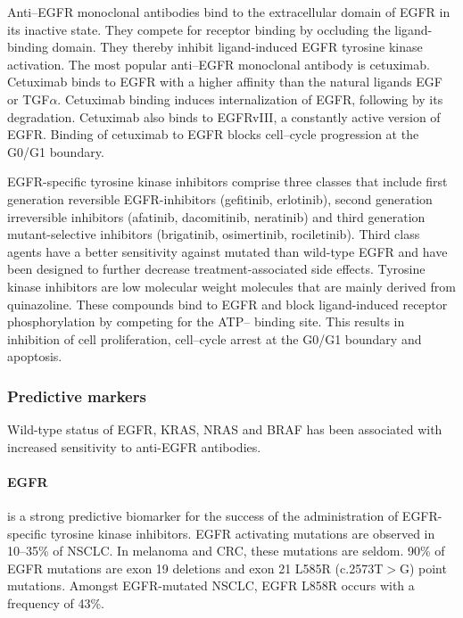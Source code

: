 {{{      Anti--EGFR monoclonal antibodies bind to the extracellular domain of EGFR
      in its inactive state. They compete for receptor binding by occluding the
      ligand-binding domain. They thereby inhibit ligand-induced EGFR tyrosine
      kinase activation. The most popular anti--EGFR monoclonal antibody is
      cetuximab. Cetuximab binds to EGFR with a higher affinity than the natural
      ligands EGF or TGF$\alpha$. Cetuximab binding induces internalization of
      EGFR, following by its degradation. Cetuximab also binds to EGFRvIII, a
      constantly active version of EGFR. Binding of cetuximab to EGFR blocks
      cell--cycle progression at the G0/G1 boundary.

      EGFR-specific tyrosine kinase inhibitors comprise three classes that
      include first generation reversible  EGFR-inhibitors (gefitinib,
      erlotinib), second generation irreversible inhibitors (afatinib,
      dacomitinib, neratinib) and third generation mutant-selective inhibitors
      (brigatinib, osimertinib, rociletinib). Third class agents have a better
      sensitivity against mutated than wild-type EGFR and have been designed to
      further decrease treatment-associated side effects. Tyrosine
      kinase inhibitors are low molecular weight molecules that are mainly
      derived from quinazoline. These compounds bind to EGFR and block
      ligand-induced receptor phosphorylation by competing for the ATP--
      binding site. This results in inhibition of cell proliferation,
      cell--cycle arrest at the G0/G1 boundary and apoptosis.

    \subsubsection{Predictive markers}

      Wild-type status of EGFR, KRAS, NRAS and BRAF has been associated with
      increased sensitivity to anti-EGFR antibodies.

      \paragraph{EGFR} is a strong predictive biomarker for the success of the
      administration of EGFR-specific tyrosine kinase inhibitors. EGFR
      activating mutations are observed in 10--35\% of NSCLC. In melanoma and
      CRC, these mutations are seldom. 90\% of EGFR mutations are exon 19
      deletions and exon 21 L585R (c.2573T$>$G) point mutations. Amongst
      EGFR-mutated NSCLC, EGFR L858R occurs with a frequency of 43\%.

}}}
